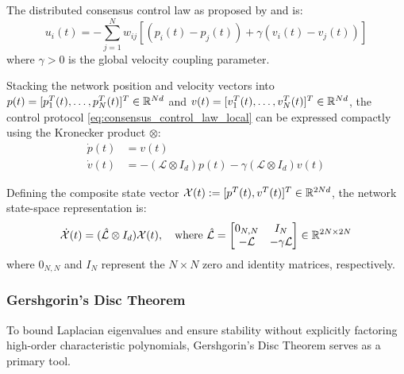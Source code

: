 The distributed consensus control law as proposed by \cite{ren2005second} and \cite{ren2008consensus} is:
\begin{equation}\label{eq:consensus_control_law_local}
    u_i(t) = -\sum_{j=1}^{N} w_{ij} \left[ \left( p_i(t) - p_j(t) \right) + \gamma \left( v_i(t) - v_j(t) \right) \right]
\end{equation}
where $\gamma > 0$ is the global velocity coupling parameter.

Stacking the network position and velocity vectors into $p(t) = [p_1^T(t), \dots, p_N^T(t)]^T \in \mathbb{R}^{Nd}$ and $v(t) = [v_1^T(t), \dots, v_N^T(t)]^T \in \mathbb{R}^{Nd}$, the control protocol \eqref{eq:consensus_control_law_local} can be expressed compactly using the Kronecker product $\otimes$:
\begin{equation}\label{eq:network_dynamics_kronecker}
    \begin{aligned}
        \dot{p}(t) &= v(t) \\
        \dot{v}(t) &= -(\mathcal{L} \otimes I_d) p(t) - \gamma (\mathcal{L} \otimes I_d) v(t)
    \end{aligned}
\end{equation}

Defining the composite state vector $\mathcal{X}(t) := [p^T(t), v^T(t)]^T \in \mathbb{R}^{2Nd}$, the network state-space representation is:
\begin{equation}\label{eq:composite_state_space}
    \dot{\mathcal{X}}(t) = (\hat{\mathcal{L}} \otimes I_d) \mathcal{X}(t), \quad \text{where } \hat{\mathcal{L}} = \begin{bmatrix} 0_{N,N} & I_N \\ -\mathcal{L} & -\gamma \mathcal{L} \end{bmatrix} \in \mathbb{R}^{2N \times 2N}
\end{equation}
where $0_{N,N}$ and $I_N$ represent the $N \times N$ zero and identity matrices, respectively.

\subsubsection{Gershgorin's Disc Theorem}

To bound Laplacian eigenvalues and ensure stability without explicitly factoring high-order characteristic polynomials, Gershgorin's Disc Theorem serves as a primary tool.

